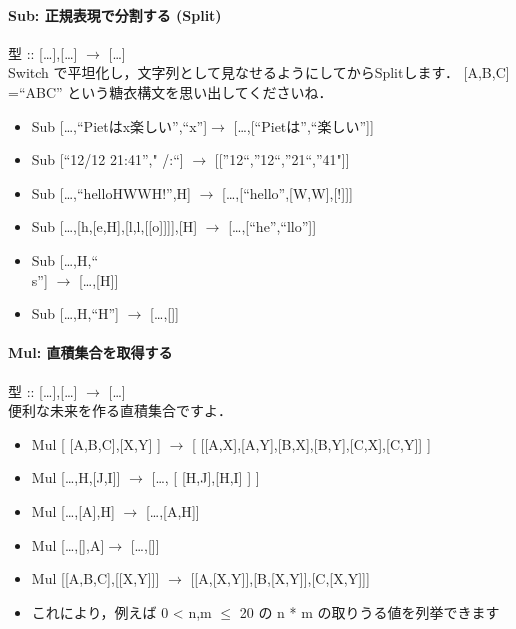 \paragraph{Sub: 正規表現で分割する (Split)}

型 :: {[}\ldots{}{]},{[}\ldots{}{]} $\to$
{[}\ldots{}{]}\\Switch
で平坦化し，文字列として見なせるようにしてからSplitします． {[}A,B,C{]}
=``ABC'' という糖衣構文を思い出してくださいね．

\begin{itemize}
\item
  Sub {[}\ldots{},``Pietはx楽しい'',``x''{]}$\to$
  {[}\ldots{},{[}``Pietは'',``楽しい''{]}{]}
\item
  Sub {[}``12/12 21:41''," \textbar{}/\textbar{}:``{]} $\to$
  {[}{[}''12``,''12``,''21``,''41"{]}{]}
\item
  Sub {[}\ldots{},``helloHWWH!'',H{]} $\to$
  {[}\ldots{},{[}``hello'',{[}W,W{]},{[}!{]}{]}{]}
\item
  Sub {[}\ldots{},{[}h,{[}e,H{]},{[}l,l,{[}{[}o{]}{]}{]}{]},{[}H{]}
  $\to$ {[}\ldots{},{[}``he'',``llo''{]}{]}
\item
  Sub {[}\ldots{},H,``\\s''{]} $\to$ {[}\ldots{},{[}H{]}{]}
\item
  Sub {[}\ldots{},H,``H''{]} $\to$ {[}\ldots{},{[}{]}{]}
\end{itemize}

\paragraph{Mul: 直積集合を取得する}

型 :: {[}\ldots{}{]},{[}\ldots{}{]} $\to$
{[}\ldots{}{]}\\便利な未来を作る直積集合ですよ．

\begin{itemize}
\item
  Mul {[} {[}A,B,C{]},{[}X,Y{]} {]} $\to$ {[}
  {[}{[}A,X{]},{[}A,Y{]},{[}B,X{]},{[}B,Y{]},{[}C,X{]},{[}C,Y{]}{]} {]}
\item
  Mul {[}\ldots{},H,{[}J,I{]}{]} $\to$ {[}\ldots{}, {[}
  {[}H,J{]},{[}H,I{]} {]} {]}
\item
  Mul {[}\ldots{},{[}A{]},H{]} $\to$ {[}\ldots{},{[}A,H{]}{]}
\item
  Mul {[}\ldots{},{[}{]},A{]}$\to$ {[}\ldots{},{[}{]}{]}
\item
  Mul {[}{[}A,B,C{]},{[}{[}X,Y{]}{]}{]} $\to$
  {[}{[}A,{[}X,Y{]}{]},{[}B,{[}X,Y{]}{]},{[}C,{[}X,Y{]}{]}{]}
\item
  これにより，例えば 0 \textless{} n,m $\leq$ 20 の n * m
  の取りうる値を列挙できます
\end{itemize}


